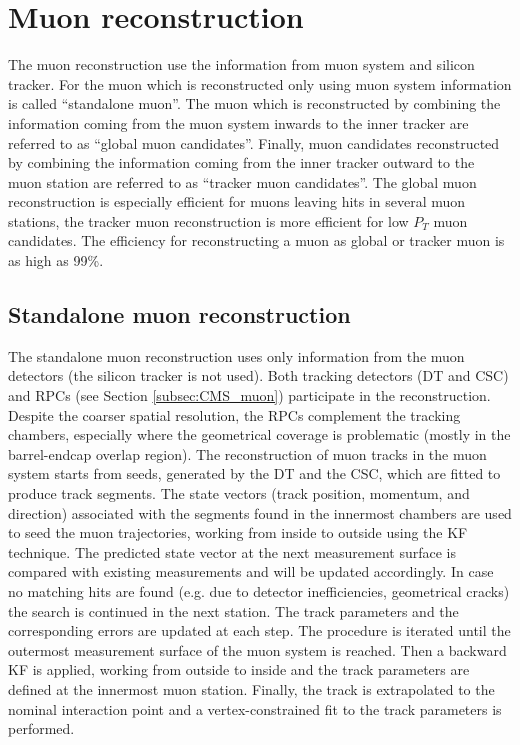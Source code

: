 \section{Muon reconstruction}\label{sec:muon}
The muon reconstruction use the information from muon system and silicon tracker. For the muon which is reconstructed only using muon system information is called ``standalone muon''. The muon which is reconstructed by combining the information coming from the muon system inwards to the inner tracker are referred to as ``global muon candidates''. Finally, muon candidates reconstructed by combining the information coming from the inner tracker outward to the muon station are referred to as ``tracker muon candidates''. The global muon reconstruction is especially efficient for muons leaving hits in several muon stations, the tracker muon reconstruction
is more efficient for low $P_{T}$ muon candidates. The efficiency for reconstructing a muon as global or tracker muon is as high as 99\%.

\subsection{Standalone muon reconstruction}\label{subsec:Standalone_muon}

The standalone muon reconstruction uses only information from the muon detectors (the silicon tracker is not used). Both tracking detectors (DT and CSC) and RPCs (see Section \ref{subsec:CMS_muon}) participate in the reconstruction. Despite the coarser spatial resolution, the RPCs complement the tracking chambers, especially where the geometrical coverage is problematic (mostly in the barrel-endcap overlap region). The reconstruction of muon tracks in the muon system starts from seeds, generated by the DT and the CSC, which are fitted to produce track segments. The state vectors (track position, momentum, and direction) associated with the segments found in the innermost chambers are used to seed the muon trajectories, working from inside to outside using the KF technique. The predicted state vector at the next measurement surface is compared with existing measurements and will be updated accordingly. In case no matching hits are found (e.g. due to detector inefficiencies, geometrical cracks) the search is continued in the next station. The track parameters and the corresponding errors are updated at each step. The procedure is iterated until the outermost measurement surface of the muon system is reached. Then a backward KF is applied, working from outside to inside and the track parameters are defined at the innermost muon station. Finally, the track is extrapolated to the nominal interaction point and a vertex-constrained fit to the track parameters is performed.

